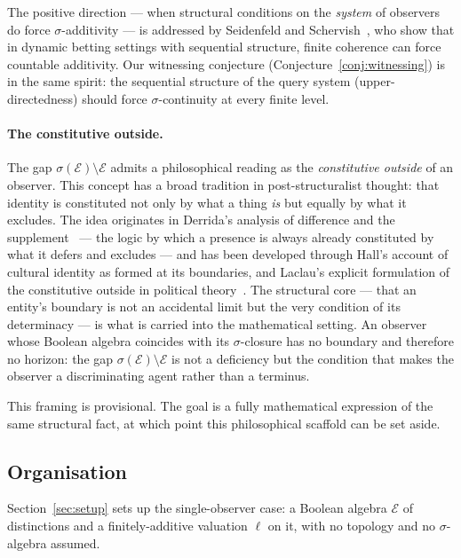 \documentclass[12pt]{article}
\theoremstyle{definition}
\theoremstyle{remark}
\newcommand{\E}{\mathcal{E}}
\newcommand{\sigE}{\sigma(\mathcal{E})}
\begin{document}
The positive direction --- when structural conditions on the \emph{system} of observers
do force $\sigma$-additivity --- is addressed by Seidenfeld and
Schervish~\cite{SeidenfeldSchervish1983}, who show that in dynamic betting settings
with sequential structure, finite coherence can force countable additivity.  Our
witnessing conjecture (Conjecture~\ref{conj:witnessing}) is in the same spirit:
the sequential structure of the query system (upper-directedness) should force
$\sigma$-continuity at every finite level.

\begin{aside}
\paragraph{The constitutive outside.}
The gap $\sigE \setminus \E$ admits a philosophical reading as the \emph{constitutive
outside} of an observer.  This concept has a broad tradition in post-structuralist
thought: that identity is constituted not only by what a thing \emph{is} but equally
by what it excludes.  The idea originates in Derrida's analysis of difference and the
supplement~\cite{Derrida1967} --- the logic by which a presence is always already
constituted by what it defers and excludes --- and has been developed through Hall's
account of cultural identity as formed at its boundaries, and Laclau's explicit
formulation of the constitutive outside in political theory~\cite{Laclau1990}.  The
structural core --- that an entity's boundary is not an accidental limit but the very
condition of its determinacy --- is what is carried into the mathematical setting.  An
observer whose Boolean algebra coincides with its $\sigma$-closure has no boundary
and therefore no horizon: the gap $\sigE \setminus \E$ is not a deficiency but the
condition that makes the observer a discriminating agent rather than a terminus.

This framing is provisional.  The goal is a fully mathematical expression of the
same structural fact, at which point this philosophical scaffold can be set aside.
\end{aside}

\subsection{Organisation}

Section~\ref{sec:setup} sets up the single-observer case: a Boolean algebra $\E$ of
distinctions and a finitely-additive valuation $\ell$ on it, with no topology and no
$\sigma$-algebra assumed.
\end{document}
